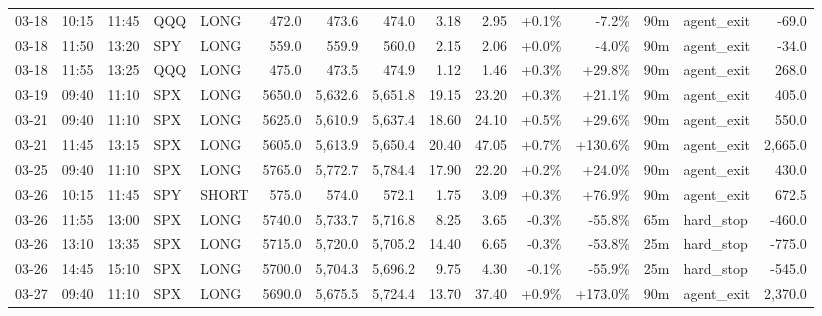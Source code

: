 \documentclass[11pt,a4paper,twoside]{article}
\begin{document}
\begin{landscape}
\begin{center}
\begin{longtable}{>{\color{txtmain}}l l l l l r r r r r r r r >{\color{txtmain}}l r}
03-18 & 10:15 & 11:45 & QQQ & LONG & 472.0 & 473.6 & 474.0 & 3.18 & 2.95 & \textcolor{wingreen}{+0.1\%} & \textcolor{lossred}{-7.2\%} & 90m & agent\_exit & \textcolor{lossred}{-69.0} \\
03-18 & 11:50 & 13:20 & SPY & LONG & 559.0 & 559.9 & 560.0 & 2.15 & 2.06 & \textcolor{wingreen}{+0.0\%} & \textcolor{lossred}{-4.0\%} & 90m & agent\_exit & \textcolor{lossred}{-34.0} \\
03-18 & 11:55 & 13:25 & QQQ & LONG & 475.0 & 473.5 & 474.9 & 1.12 & 1.46 & \textcolor{wingreen}{+0.3\%} & \textcolor{wingreen}{+29.8\%} & 90m & agent\_exit & \textcolor{wingreen}{268.0} \\
03-19 & 09:40 & 11:10 & SPX & LONG & 5650.0 & 5,632.6 & 5,651.8 & 19.15 & 23.20 & \textcolor{wingreen}{+0.3\%} & \textcolor{wingreen}{+21.1\%} & 90m & agent\_exit & \textcolor{wingreen}{405.0} \\
03-21 & 09:40 & 11:10 & SPX & LONG & 5625.0 & 5,610.9 & 5,637.4 & 18.60 & 24.10 & \textcolor{wingreen}{+0.5\%} & \textcolor{wingreen}{+29.6\%} & 90m & agent\_exit & \textcolor{wingreen}{550.0} \\
03-21 & 11:45 & 13:15 & SPX & LONG & 5605.0 & 5,613.9 & 5,650.4 & 20.40 & 47.05 & \textcolor{wingreen}{+0.7\%} & \textcolor{wingreen}{+130.6\%} & 90m & agent\_exit & \textcolor{wingreen}{2,665.0} \\
03-25 & 09:40 & 11:10 & SPX & LONG & 5765.0 & 5,772.7 & 5,784.4 & 17.90 & 22.20 & \textcolor{wingreen}{+0.2\%} & \textcolor{wingreen}{+24.0\%} & 90m & agent\_exit & \textcolor{wingreen}{430.0} \\
03-26 & 10:15 & 11:45 & SPY & SHORT & 575.0 & 574.0 & 572.1 & 1.75 & 3.09 & \textcolor{wingreen}{+0.3\%} & \textcolor{wingreen}{+76.9\%} & 90m & agent\_exit & \textcolor{wingreen}{672.5} \\
03-26 & 11:55 & 13:00 & SPX & LONG & 5740.0 & 5,733.7 & 5,716.8 & 8.25 & 3.65 & \textcolor{lossred}{-0.3\%} & \textcolor{lossred}{-55.8\%} & 65m & hard\_stop & \textcolor{lossred}{-460.0} \\
03-26 & 13:10 & 13:35 & SPX & LONG & 5715.0 & 5,720.0 & 5,705.2 & 14.40 & 6.65 & \textcolor{lossred}{-0.3\%} & \textcolor{lossred}{-53.8\%} & 25m & hard\_stop & \textcolor{lossred}{-775.0} \\
03-26 & 14:45 & 15:10 & SPX & LONG & 5700.0 & 5,704.3 & 5,696.2 & 9.75 & 4.30 & \textcolor{lossred}{-0.1\%} & \textcolor{lossred}{-55.9\%} & 25m & hard\_stop & \textcolor{lossred}{-545.0} \\
03-27 & 09:40 & 11:10 & SPX & LONG & 5690.0 & 5,675.5 & 5,724.4 & 13.70 & 37.40 & \textcolor{wingreen}{+0.9\%} & \textcolor{wingreen}{+173.0\%} & 90m & agent\_exit & \textcolor{wingreen}{2,370.0} \\

\end{longtable}
\end{center}
\end{landscape}
\end{document}

